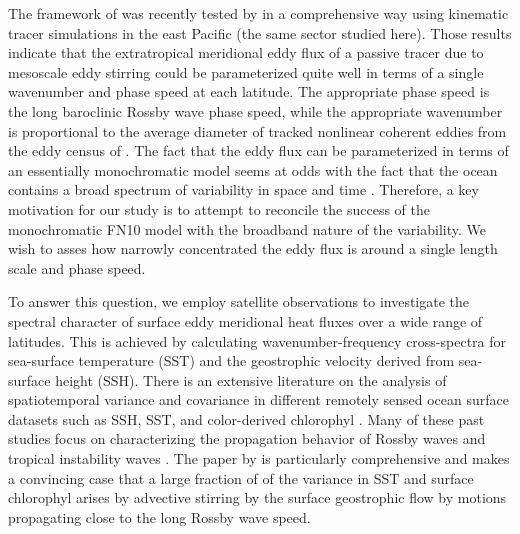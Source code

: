 \documentclass[10pt]{article}
\begin{document}
The framework of \citet{FerrariNikurashin2010} was recently tested by \citet[][henceforth KA14]{KlockerAbernathey2014} in a comprehensive way using kinematic tracer simulations in the east Pacific (the same sector studied here). Those results indicate that the extratropical meridional eddy flux of a passive tracer due to mesoscale eddy stirring could be parameterized quite well in terms of a single wavenumber and phase speed at each latitude. The appropriate phase speed is the long baroclinic Rossby wave phase speed, while the appropriate wavenumber is proportional to the average diameter of tracked nonlinear coherent eddies from the eddy census of \citet{CheltonEtAl2011}. The fact that the eddy flux can be parameterized in terms of an essentially monochromatic model seems at odds with the fact that the ocean contains a broad spectrum of variability in space and time \citep{WorthamWunsch2014}. Therefore, a key motivation for our study is to attempt to reconcile the success of the monochromatic FN10 model with the broadband nature of the variability. We wish to asses how narrowly concentrated the eddy flux is around a single length scale and phase speed.

To answer this question, we employ satellite observations to investigate the spectral character of surface eddy meridional heat fluxes over a wide range of latitudes. This is achieved by calculating wavenumber-frequency cross-spectra for sea-surface temperature (SST) and the geostrophic velocity derived from sea-surface height (SSH). There is an extensive literature on the analysis of spatiotemporal variance and covariance in different remotely sensed ocean surface datasets such as SSH, SST, and color-derived chlorophyl \citep[see review by][]{OBrienEtAl2013}. Many of these past studies focus on characterizing the propagation behavior of Rossby waves \citep{CheltonSchalx1996,PolitoCornillon1997,CipolliniEtAl1997,HillEtAl2000,CipolliniEtAl2001,PolitoLiu2003,KillworthEtAl2004} and tropical instability waves \citep{PolitoEtAl2001,Contreras2002,CheltonEtAl2000,LeeEtAl2012}. The paper by \citet{KillworthEtAl2004} is particularly comprehensive and makes a convincing case that a large fraction of of the variance in SST and surface chlorophyl arises by advective stirring by the surface geostrophic flow by motions propagating close to the long Rossby wave speed.
\end{document}
